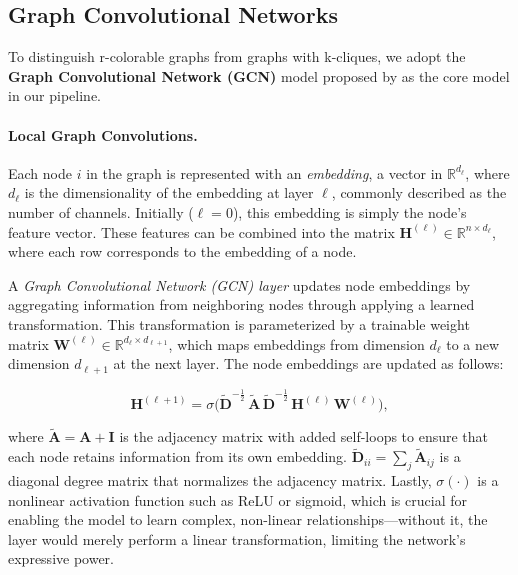 \subsection{Graph Convolutional Networks}
\label{sec:GCN}

To distinguish r-colorable graphs from graphs with k-cliques, we adopt the
\textbf{Graph Convolutional Network (GCN)} model proposed by \citet{GCNKipf2016} as the
core model in our pipeline.

\paragraph{Local Graph Convolutions.}  
Each node $i$ in the graph is represented with an \emph{embedding}, a vector in $\mathbb{R}^{d_{\ell}}$, where $ d_{\ell} $ is the dimensionality of the embedding at layer $ \ell $, commonly described as the number of channels. Initially ($\ell = 0$), this embedding is simply the node’s feature vector. These features can be combined into the matrix $\mathbf{H}^{(\ell)} \in \mathbb{R}^{n \times d_{\ell}}$, where each row corresponds to the embedding of a node.  

A \emph{Graph Convolutional Network (GCN) layer} updates node embeddings by aggregating information from neighboring nodes through applying a learned transformation. This transformation is parameterized by a trainable weight matrix $ \mathbf{W}^{(\ell)} \in \mathbb{R}^{d_{\ell} \times d_{\ell + 1}} $, which maps embeddings from dimension $ d_{\ell} $ to a new dimension $ d_{\ell+1} $ at the next layer. The node embeddings are updated as follows:

\begin{equation}   
    \mathbf{H}^{(\ell+1)} 
    = \sigma\!\Big(
        \widetilde{\mathbf{D}}^{-\frac12} \,
        \widetilde{\mathbf{A}} \,
        \widetilde{\mathbf{D}}^{-\frac12} \,
        \mathbf{H}^{(\ell)} \,
        \mathbf{W}^{(\ell)}
    \Big),
\end{equation}

where $ \tilde{\mathbf{A}} = \mathbf{A} + \mathbf{I} $ is the adjacency matrix with added self-loops to ensure that each node retains information from its own embedding. $ \tilde{\mathbf{D}}_{ii} = \sum_j \tilde{\mathbf{A}}_{ij} $ is a diagonal degree matrix that normalizes the adjacency matrix. Lastly, $ \sigma(\cdot) $ is a nonlinear activation function such as ReLU or sigmoid, which is crucial for enabling the model to learn complex, non-linear relationships—without it, the layer would merely perform a linear transformation, limiting the network’s expressive power.  

